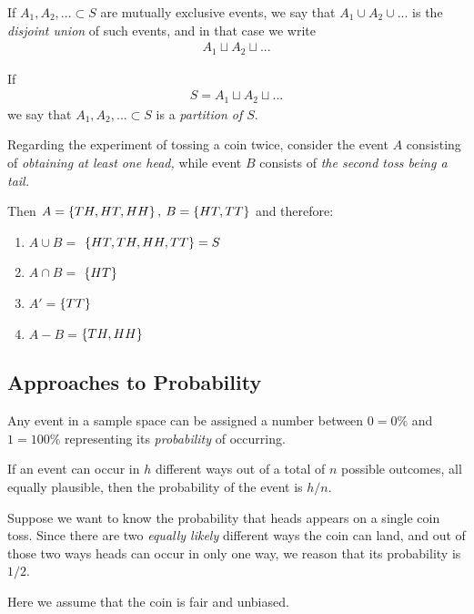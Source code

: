 \begin{definition}
	If $A_{1}, A_{2}, ...\subset S$ are mutually exclusive events, we say that $A_{1} \cup A_{2} \cup ... $ is the \emph{disjoint union} of such events, and in that case we write
	\begin{align}
		A_{1}\sqcup A_{2} \sqcup ...
	\end{align}
\end{definition}


\begin{definition}
	If \begin{align}
		S=A_{1}\sqcup A_{2} \sqcup ...
	\end{align}
	we say that $A_{1},A_{2},...\subset S$ is a \emph{partition of $S.$}
\end{definition}


\begin{example}
	\label{exmp:2.2.9}
	Regarding the experiment of tossing a coin twice, consider the event $A$ consisting of \emph{obtaining at least one head,} while event $B$ consists of \emph{the second toss being a tail.}
	
	Then $A=\left\{ TH,HT,HH \right\},$ $B=\left\{ HT,TT \right\}$ and therefore:
	\begin{enumerate}
		\item $A\cup B =$ $\left\{ HT,TH,HH,TT \right\}= S$ 
		\item $A\cap B =$ $\left\{ HT \right\}$ 
		\item $A'=$$\left\{ TT \right\}$
		\item $A-B=$$\left\{ TH,HH \right\}$
	\end{enumerate}
	
\end{example}


\subsection{Approaches to Probability}

Any event in a sample space can be assigned a number between $0=0\%$ and $1=100\%$ representing its \emph{probability} of occurring.


If an event can occur in $h$ different ways out of a total of $n$ possible outcomes, all equally plausible, then the probability of the event is $h/n.$


\begin{example}
	\label{exmp:2.2.10}
	Suppose we want to know the probability that heads appears on a single coin toss. Since there are two \emph{equally likely} different ways the coin can land, and out of those two ways heads can occur in only one way, we reason that its probability is $1/2.$
	
	
	\begin{remark}
		Here we assume that the coin is fair and unbiased.
	\end{remark}
	
\end{example}


